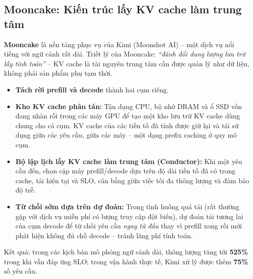 \subsection{Mooncake: Kiến trúc lấy KV cache làm trung tâm}
\label{ssec:mooncake}
\textbf{Mooncake} \cite{qin2024mooncake} là nền tảng phục vụ của Kimi (Moonshot AI) -- một dịch vụ nổi tiếng với ngữ cảnh rất dài. Triết lý của Mooncake: \emph{“đánh đổi dung lượng lưu trữ lấy tính toán”} -- KV cache là tài nguyên trung tâm cần được quản lý như dữ liệu, không phải sản phẩm phụ tạm thời.
\begin{itemize}
	\item \textbf{Tách rời prefill và decode} thành hai cụm riêng.
	\item \textbf{Kho KV cache phân tán:} Tận dụng CPU, bộ nhớ DRAM và ổ SSD vốn đang nhàn rỗi trong các máy GPU để tạo một kho lưu trữ KV cache dùng chung cho cả cụm. KV cache của các tiền tố đã tính được giữ lại và tái sử dụng giữa các yêu cầu, giữa các máy -- một dạng prefix caching ở quy mô cụm.
	\item \textbf{Bộ lập lịch lấy KV cache làm trung tâm (Conductor):} Khi một yêu cầu đến, chọn cặp máy prefill/decode dựa trên độ dài tiền tố đã có trong cache, tải hiện tại và SLO, cân bằng giữa việc tối đa thông lượng và đảm bảo độ trễ.
	\item \textbf{Từ chối sớm dựa trên dự đoán:} Trong tình huống quá tải (rất thường gặp với dịch vụ miễn phí có lượng truy cập đột biến), dự đoán tải tương lai của cụm decode để từ chối yêu cầu \emph{ngay từ đầu} thay vì prefill xong rồi mới phát hiện không đủ chỗ decode -- tránh lãng phí tính toán.
\end{itemize}
Kết quả: trong các kịch bản mô phỏng ngữ cảnh dài, thông lượng tăng tới \textbf{525\%} trong khi vẫn đáp ứng SLO; trong vận hành thực tế, Kimi xử lý được thêm \textbf{75\%} số yêu cầu.

\begin{center}
\label{fig:mooncake}
\end{center}

